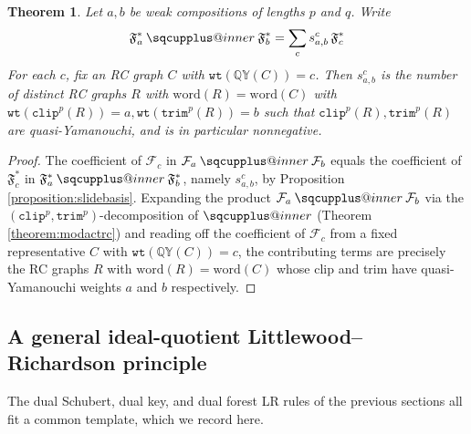 \documentclass{amsart}
\makeatletter
\newcommand{\sqcupplus@inner}[2]{%
  \vcenter{\hbox{\ooalign{%
    \hfil$\m@th#1\sqcup$\hfil\cr
    \hfil\raisebox{0.15ex}{$\m@th#1\scriptscriptstyle+$}\hfil\cr
  }}}%
}
\newcommand{\sqcupplus}{\mathbin{\mathpalette\sqcupplus@inner\relax}}
\newtheorem{theorem}{Theorem}[section]
\theoremstyle{definition}
\theoremstyle{remark}
\numberwithin{equation}{subsection}
\newcommand{\wtt}{\mathtt{wt}}
\newcommand{\QY}{\ensuremath{\mathbb{QY}}}
\newcommand{\trm}{\mathtt{trim}}
\newcommand{\clp}{\mathtt{clip}}
\makeatother
\begin{document}
\begin{theorem} \label{theorem:lrfslide}
  Let $a,b$ be weak compositions of lengths $p$ and $q$. Write
$$\mathfrak{F}_a^*\sqcupplus\mathfrak{F}_b^*=\sum_c s_{a,b}^c\,\mathfrak{F}_c^*$$
For each $c$, fix an RC graph $C$ with $\wtt(\QY(C)) = c$. Then $s_{a,b}^c$ is the number of distinct RC graphs $R$ with $\mathrm{word}(R)=\mathrm{word}(C)$ with $\wtt(\clp^p(R)) = a,\wtt(\trm^p(R)) = b$ such that $\clp^p(R),\trm^p(R)$ are quasi-Yamanouchi, and is in particular nonnegative.
\end{theorem}
\begin{proof}
The coefficient of $\mathcal{F}_c$ in $\mathcal{F}_a\sqcupplus\mathcal{F}_b$ equals the coefficient of $\mathfrak{F}_c^*$ in $\mathfrak{F}_a^*\sqcupplus\mathfrak{F}_b^*$, namely $s_{a,b}^c$, by Proposition \ref{proposition:slidebasis}. Expanding the product $\mathcal{F}_a\sqcupplus\mathcal{F}_b$ via the $(\clp^p,\trm^p)$-decomposition of $\sqcupplus$ (Theorem \ref{theorem:modactrc}) and reading off the coefficient of $\mathcal{F}_c$ from a fixed representative $C$ with $\wtt(\QY(C))=c$, the contributing terms are precisely the RC graphs $R$ with $\mathrm{word}(R)=\mathrm{word}(C)$ whose clip and trim have quasi-Yamanouchi weights $a$ and $b$ respectively.
\end{proof}

\subsection{A general ideal-quotient Littlewood--Richardson principle}

The dual Schubert, dual key, and dual forest LR rules of the previous sections all fit a common template, which we record here.
\end{document}
